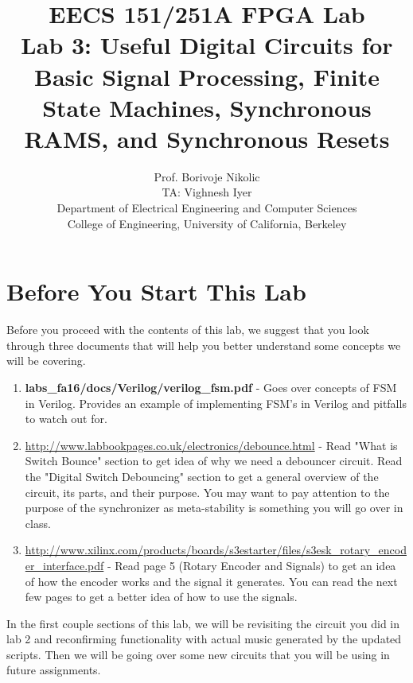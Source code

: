\documentclass[11pt]{article}
\begin{document}
\title{EECS 151/251A FPGA Lab\\
Lab 3: Useful Digital Circuits for Basic Signal Processing, Finite State Machines, Synchronous RAMS, and Synchronous Resets}

\author{Prof. Borivoje Nikolic \\
TA: Vighnesh Iyer \\Department of Electrical Engineering and Computer Sciences\\
College of Engineering, University of California, Berkeley}
\date{}
\maketitle

\section{Before You Start This Lab}

Before you proceed with the contents of this lab, we suggest that you look through three documents that will help you better understand some concepts we will be covering.

\begin{enumerate}
	\item \textbf{labs\_fa16/docs/Verilog/verilog\_fsm.pdf} - Goes over concepts of FSM in Verilog. Provides an example of  implementing FSM's in Verilog and pitfalls to watch out for.
	
	\item \url{http://www.labbookpages.co.uk/electronics/debounce.html} - Read "What is Switch Bounce" section to get idea of why we need a debouncer circuit. Read the "Digital Switch Debouncing" section to get a general overview of the circuit, its parts, and their purpose. You may want to pay attention to the purpose of the synchronizer as meta-stability is something you will go over in class. 
	
	\item \url{http://www.xilinx.com/products/boards/s3estarter/files/s3esk_rotary_encoder_interface.pdf} - Read page 5 (Rotary Encoder and Signals) to get an idea of how the encoder works and the signal it generates. You can read the next few pages to get a better idea of how to use the signals. 

\end{enumerate}

In the first couple sections of this lab, we will be revisiting the circuit you did in lab 2 and reconfirming functionality with actual music generated by the updated scripts. Then we will be going over some new circuits that you will be using in future assignments.
\end{document}
